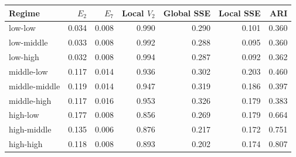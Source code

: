 \begin{tabular}{lrrrrrr}
\toprule
Regime & $E_2$ & $E_7$ & Local $V_2$ & Global SSE & Local SSE & ARI\\
\midrule
low-low & 0.034 & 0.008 & 0.990 & 0.290 & 0.101 & 0.360\\
low-middle & 0.033 & 0.008 & 0.992 & 0.288 & 0.095 & 0.360\\
low-high & 0.032 & 0.008 & 0.994 & 0.287 & 0.092 & 0.362\\
middle-low & 0.117 & 0.014 & 0.936 & 0.302 & 0.203 & 0.460\\
middle-middle & 0.119 & 0.014 & 0.947 & 0.319 & 0.186 & 0.397\\
middle-high & 0.117 & 0.016 & 0.953 & 0.326 & 0.179 & 0.383\\
high-low & 0.177 & 0.008 & 0.856 & 0.269 & 0.179 & 0.664\\
high-middle & 0.135 & 0.006 & 0.876 & 0.217 & 0.172 & 0.751\\
high-high & 0.118 & 0.008 & 0.893 & 0.202 & 0.174 & 0.807\\
\bottomrule
\end{tabular}
